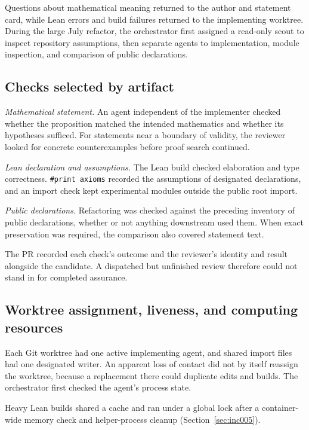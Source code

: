 Questions about mathematical meaning returned to the author and statement
card, while Lean errors and build failures returned to the implementing
worktree. During the large July refactor, the orchestrator first assigned
a read-only scout to inspect repository assumptions, then separate agents
to implementation, module inspection, and comparison of public
declarations. %

\subsection{Checks selected by artifact}

\emph{Mathematical statement.}
An agent independent of the implementer checked whether the proposition
matched the intended mathematics and whether its hypotheses sufficed.
For statements near a boundary of validity, the reviewer looked for
concrete counterexamples before proof search continued.

\emph{Lean declaration and assumptions.}
The Lean build checked elaboration and type correctness.
\texttt{\#print axioms} recorded the assumptions of designated
declarations, and an import check kept experimental modules outside the
public root import. %

\emph{Public declarations.}
Refactoring was checked against the preceding inventory of public
declarations, whether or not anything downstream used them. When exact
preservation was required, the comparison also covered statement text. %

The PR recorded each check's outcome and the reviewer's identity and
result alongside the candidate. A dispatched but unfinished review
therefore could not stand in for completed assurance.

\subsection{Worktree assignment, liveness, and computing resources}

Each Git worktree had one active implementing agent, and shared import
files had one designated writer. An apparent loss of contact did not by itself reassign the worktree,
because a replacement there could duplicate edits and builds. The
orchestrator first checked the agent's process state. %

Heavy Lean builds shared a cache and ran under a global lock after a
container-wide memory check and helper-process cleanup
(Section~\ref{sec:inc005}). %

